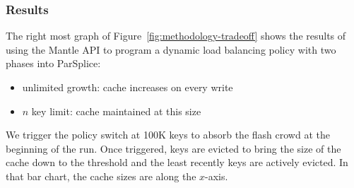 %
%

\subsubsection*{Results}

The right most graph of Figure~\ref{fig:methodology-tradeoff} shows the results
of using the Mantle API to program a dynamic load balancing policy with two
phases into ParSplice:

\begin{itemize}
  \item unlimited growth: cache increases on every write
  \item \(n\) key limit: cache maintained at this size
\end{itemize}

We trigger the policy switch at 100K keys to absorb the flash crowd at the
beginning of the run. Once triggered, keys are evicted to bring the size of the
cache down to the threshold and the least recently keys are actively evicted.
In that bar chart, the cache sizes are along the \(x\)-axis.

